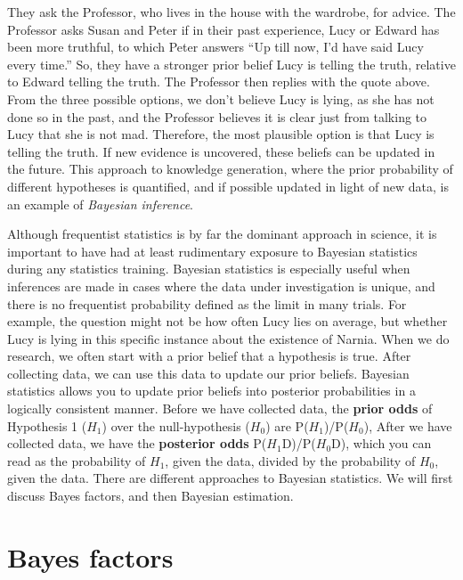 \documentclass[
  oneside]{book}
\begin{document}
They ask the Professor, who lives in the house with the wardrobe, for advice. The Professor asks Susan and Peter if in their past experience, Lucy or Edward has been more truthful, to which Peter answers ``Up till now, I'd have said Lucy every time.'' So, they have a stronger prior belief Lucy is telling the truth, relative to Edward telling the truth. The Professor then replies with the quote above. From the three possible options, we don't believe Lucy is lying, as she has not done so in the past, and the Professor believes it is clear just from talking to Lucy that she is not mad. Therefore, the most plausible option is that Lucy is telling the truth. If new evidence is uncovered, these beliefs can be updated in the future. This approach to knowledge generation, where the prior probability of different hypotheses is quantified, and if possible updated in light of new data, is an example of \emph{Bayesian inference}.

Although frequentist statistics is by far the dominant approach in science, it is important to have had at least rudimentary exposure to Bayesian statistics during any statistics training. Bayesian statistics is especially useful when inferences are made in cases where the data under investigation is unique, and there is no frequentist probability defined as the limit in many trials. For example, the question might not be how often Lucy lies on average, but whether Lucy is lying in this specific instance about the existence of Narnia. When we do research, we often start with a prior belief that a hypothesis is true. After collecting data, we can use this data to update our prior beliefs. Bayesian statistics allows you to update prior beliefs into posterior probabilities in a logically consistent manner. Before we have collected data, the \textbf{prior odds} of Hypothesis 1 (\(H_1\)) over the null-hypothesis (\(H_0\)) are P(\(H_1\))/P(\(H_0\)), After we have collected data, we have the \textbf{posterior odds} P(\(H_1\)\textbar D)/P(\(H_0\)\textbar D), which you can read as the probability of \(H_1\), given the data, divided by the probability of \(H_0\), given the data. There are different approaches to Bayesian statistics. We will first discuss Bayes factors, and then Bayesian estimation.

\hypertarget{bayes-factors}{%
\section{Bayes factors}\label{bayes-factors}}
\end{document}
